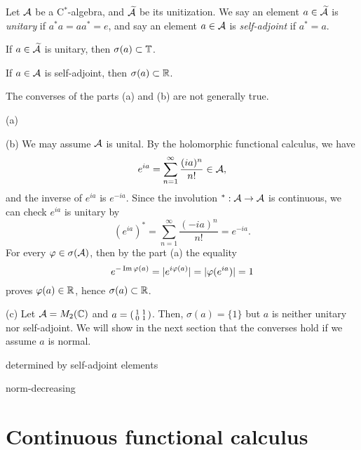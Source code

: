 \documentclass{../note}
\begin{document}
\begin{prb}
Let $\cA$ be a C$^*$-algebra, and $\tilde\cA$ be its unitization.
We say an element $a\in\tilde\cA$ is \emph{unitary} if $a^*a=aa^*=e$, and say an element $a\in\cA$ is \emph{self-adjoint} if $a^*=a$.
\begin{parts}
\item If $a\in\tilde\cA$ is unitary, then $\sigma(a)\subset\T$.
\item If $a\in\cA$ is self-adjoint, then $\sigma(a)\subset\R$.
\item The converses of the parts (a) and (b) are not generally true.
\end{parts}
\end{prb}
\begin{pf}
(a)

(b)
We may assume $\cA$ is unital.
By the holomorphic functional calculus, we have
\[e^{ia}=\sum_{n=1}^\infty\frac{(ia)^n}{n!}\in\cA,\]
and the inverse of $e^{ia}$ is $e^{-ia}$.
Since the involution $^*:\cA\to\cA$ is continuous, we can check $e^{ia}$ is unitary by
\[(e^{ia})^*=\sum_{n=1}^\infty\frac{(-ia)^n}{n!}=e^{-ia}.\]
For every $\f\in\sigma(\cA)$, then by the part (a) the equality
\[e^{-\Im\f(a)}=|e^{i\f(a)}|=|\f(e^{ia})|=1\]
proves $\f(a)\in\R$, hence $\sigma(a)\subset\R$.

(c)
Let $\cA=M_2(\C)$ and $a=(\mat[small]{1&1\\0&1})$.
Then, $\sigma(a)=\{1\}$ but $a$ is neither unitary nor self-adjoint.
We will show in the next section that the converses hold if we assume $a$ is normal.
\end{pf}


\begin{prb}[$*$-homomorphisms]
\begin{parts}
\item determined by self-adjoint elements
\item norm-decreasing
\item
\end{parts}
\end{prb}


\section{Continuous functional calculus}
\end{document}
